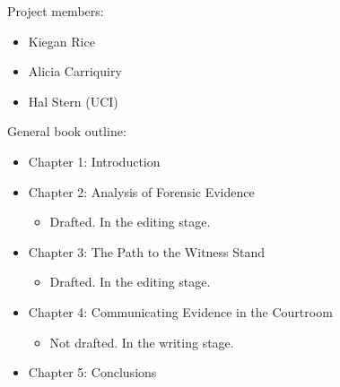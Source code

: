 \documentclass[]{book}
\providecommand{\tightlist}{%
  \setlength{\itemsep}{0pt}\setlength{\parskip}{0pt}}
\begin{document}
Project members:

\begin{itemize}
\tightlist
\item
  Kiegan Rice\\
\item
  Alicia Carriquiry\\
\item
  Hal Stern (UCI)
\end{itemize}

General book outline:

\begin{itemize}
\tightlist
\item
  Chapter 1: Introduction\\
\item
  Chapter 2: Analysis of Forensic Evidence

  \begin{itemize}
  \tightlist
  \item
    Drafted. In the editing stage.
  \end{itemize}
\item
  Chapter 3: The Path to the Witness Stand

  \begin{itemize}
  \item
    Drafted. In the editing stage.
  \end{itemize}
\item
  Chapter 4: Communicating Evidence in the Courtroom

  \begin{itemize}
  \tightlist
  \item
    Not drafted. In the writing stage.
  \end{itemize}
\item
  Chapter 5: Conclusions
\end{itemize}


\end{document}
